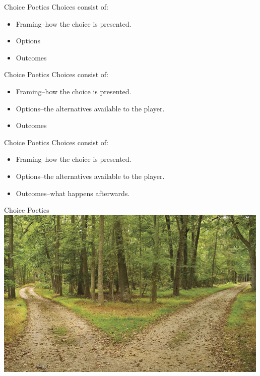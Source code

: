 \documentclass[xcolor=x11names]{beamer}
\begin{document}
\begin{frame}{Choice Poetics}
  Choices consist of:
  \begin{itemize}
    \item Framing--how the choice is presented.
    \item Options
    \item Outcomes
  \end{itemize}
\end{frame}

\begin{frame}{Choice Poetics}
  Choices consist of:
  \begin{itemize}
    \item Framing--how the choice is presented.
    \item Options--the alternatives available to the player.
    \item Outcomes
  \end{itemize}
\end{frame}

\begin{frame}{Choice Poetics}
  Choices consist of:
  \begin{itemize}
    \item Framing--how the choice is presented.
    \item Options--the alternatives available to the player.
    \item Outcomes--what happens afterwards.
  \end{itemize}
\end{frame}

\begin{frame}{Choice Poetics}
  \includegraphics[width=\textwidth]{res/two-roads.jpg}
\end{frame}
\end{document}
